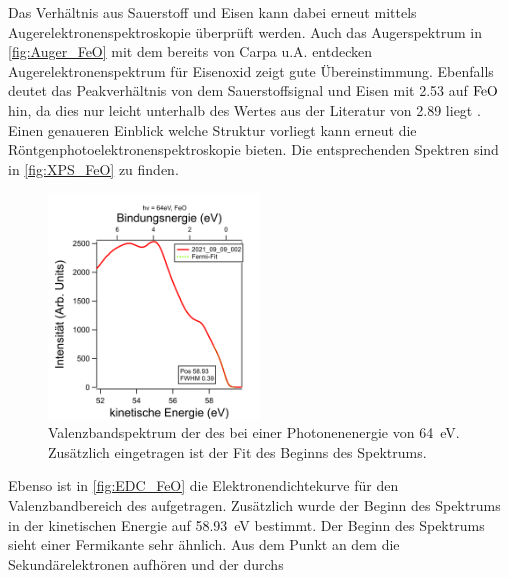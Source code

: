         Das Verhältnis aus Sauerstoff und Eisen kann dabei erneut mittels Augerelektronenspektroskopie überprüft werden.
        Auch das Augerspektrum in \autoref{fig:Auger_FeO} mit dem bereits von Carpa u.A. \cite{FeO_1} entdecken Augerelektronenspektrum für Eisenoxid zeigt gute Übereinstimmung.
        Ebenfalls deutet das Peakverhältnis von dem Sauerstoffsignal und Eisen mit \num{2.53} auf $\ce{FeO}$ hin, da dies nur leicht unterhalb des Wertes aus der Literatur von \num{2.89} liegt \cite{FeO_1}.
        Einen genaueren Einblick welche Struktur vorliegt kann erneut die Röntgenphotoelektronenspektroskopie bieten.
        Die entsprechenden Spektren sind in \autoref{fig:XPS_FeO} zu finden.

        \begin{figure}
            \centering
            \includegraphics[width=0.5\textwidth]{./content/pictures/FeO/Fermi_FeO.png}
            \caption{Valenzbandspektrum der des  bei einer Photonenenergie von \SI{64}{\electronvolt}. Zusätzlich eingetragen ist der Fit des Beginns des Spektrums.}
            \label{fig:EDC_FeO}
        \end{figure}
        Ebenso ist in \autoref{fig:EDC_FeO} die Elektronendichtekurve für den Valenzbandbereich des  aufgetragen.
        Zusätzlich wurde der Beginn des Spektrums in der kinetischen Energie auf \SI{58.93}{\electronvolt} bestimmt.
        Der Beginn des Spektrums sieht einer Fermikante sehr ähnlich.
        Aus dem Punkt an dem die Sekundärelektronen aufhören und der durchs   


